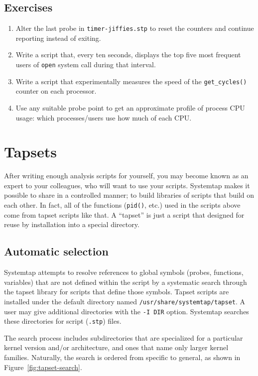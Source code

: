 \documentclass{article}
\renewcommand{\nomenclature}[2]{}
\begin{document}
\subsection{Exercises}
\begin{enumerate}
\item Alter the last probe in \verb+timer-jiffies.stp+ to reset the
counters and continue reporting instead of exiting.

\item Write a script that, every ten seconds, displays the top five
most frequent users of \verb+open+ system call during that interval.

\item Write a script that experimentally measures the speed of the
\verb+get_cycles()+ counter on each processor.

\item Use any suitable probe point to get an approximate profile of
process CPU usage: which processes/users use how much of each CPU.
\end{enumerate}

\section{Tapsets}

After writing enough analysis scripts for yourself, you may become
known as an expert to your colleagues, who will want to use your
scripts.  Systemtap makes it possible to share in a controlled manner;
to build libraries of scripts that build on each other.  In fact, all
of the functions (\verb+pid()+, etc.) used in the scripts above come
from tapset scripts like that.  A ``tapset'' is just a script that
designed for reuse by installation into a special directory.

\subsection{Automatic selection}

Systemtap attempts to resolve references to global symbols (probes,
functions, variables) that are not defined within the script by a
systematic search through the tapset library for scripts that define
those symbols.  Tapset scripts are installed under the default
directory named \verb+/usr/share/systemtap/tapset+.  A user may give
additional directories with the \verb+-I DIR+ option.  Systemtap
searches these directories for script (\verb+.stp+) files.

The search process includes subdirectories that are specialized for a
particular kernel version and/or architecture, and ones that name only
larger kernel families.  Naturally, the search is ordered from
specific to general, as shown in Figure~\ref{fig:tapset-search}.
\nomenclature{tapset search path}{A list of subdirectories searched by
systemtap for tapset scripts, allowing specialization by version
architecture.}
\end{document}
